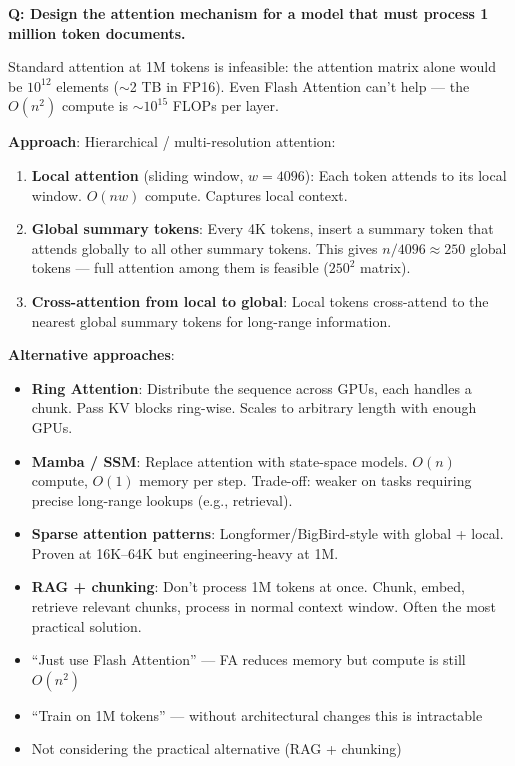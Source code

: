 \begin{interviewq}
\textbf{Q: Design the attention mechanism for a model that must process 1 million token documents.}

 \quad {} \quad \badgefreq{\freqlow}

\stronganswer Standard attention at 1M tokens is infeasible: the attention matrix alone would be $10^{12}$ elements ($\sim$2 TB in FP16). Even Flash Attention can't help --- the $O(n^2)$ compute is $\sim$$10^{15}$ FLOPs per layer.

\textbf{Approach}: Hierarchical / multi-resolution attention:

\begin{enumerate}
    \item \textbf{Local attention} (sliding window, $w=4096$): Each token attends to its local window. $O(nw)$ compute. Captures local context.
    \item \textbf{Global summary tokens}: Every 4K tokens, insert a summary token that attends globally to all other summary tokens. This gives $n/4096 \approx 250$ global tokens --- full attention among them is feasible ($250^2$ matrix).
    \item \textbf{Cross-attention from local to global}: Local tokens cross-attend to the nearest global summary tokens for long-range information.
\end{enumerate}

\textbf{Alternative approaches}:
\begin{itemize}
    \item \textbf{Ring Attention}: Distribute the sequence across GPUs, each handles a chunk. Pass KV blocks ring-wise. Scales to arbitrary length with enough GPUs.
    \item \textbf{Mamba / SSM}: Replace attention with state-space models. $O(n)$ compute, $O(1)$ memory per step. Trade-off: weaker on tasks requiring precise long-range lookups (e.g., retrieval).
    \item \textbf{Sparse attention patterns}: Longformer/BigBird-style with global + local. Proven at 16K--64K but engineering-heavy at 1M.
    \item \textbf{RAG + chunking}: Don't process 1M tokens at once. Chunk, embed, retrieve relevant chunks, process in normal context window. Often the most practical solution.
\end{itemize}

\redflags
\begin{itemize}
    \item ``Just use Flash Attention'' --- FA reduces memory but compute is still $O(n^2)$
    \item ``Train on 1M tokens'' --- without architectural changes this is intractable
    \item Not considering the practical alternative (RAG + chunking)
\end{itemize}


\end{interviewq}
